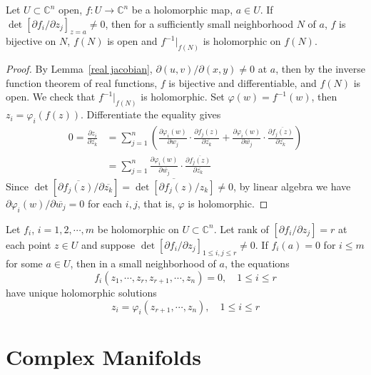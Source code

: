 \begin{thm}
    Let $U\subset\mathbb{C}^n$ open, $f:U\to\mathbb{C}^n$ be a holomorphic map, $a\in U$.
    If $\det[\partial{f_i}/\partial{z_j}]_{z=a}\neq 0$, then for a sufficiently small neighborhood $N$ of $a$, $f$ is bijective on $N$, $f(N)$ is open and $f^{-1}|_{f(N)}$ is holomorphic on $f(N)$.
\end{thm}
\begin{proof}
    By Lemma~\ref{real jacobian}, $\partial(u,v)/\partial(x,y)\neq 0$ at $a$, then by the inverse function theorem of real functions, $f$ is bijective and differentiable, and $f(N)$ is open.
    We check that $f^{-1}|_{f(N)}$ is holomorphic.
    Set $\varphi(w)=f^{-1}(w)$, then $z_i=\varphi_i(f(z))$.
    Differentiate the equality gives
    \begin{align*}
        0=\frac{\partial z_i}{\partial\overline{z_k}}&=\sum_{j=1}^n\left(\frac{\partial\varphi_i(w)}{\partial w_j}\cdot\frac{\partial f_j(z)}{\partial\overline{z_k}}+\frac{\partial\varphi_i(w)}{\partial\overline{w_j}}\cdot\frac{\partial\overline{f_j(z)}}{\partial\overline{z_k}}\right)\\
        &=\sum_{j=1}^n\frac{\partial\varphi_i(w)}{\partial\overline{w_j}}\cdot\frac{\partial\overline{f_j(z)}}{\partial\overline{z_k}}
    \end{align*}
    Since $\det[\partial\overline{f_j(z)}/\partial\overline{z_k}]=\overline{\det[\partial f_j(z)/z_k]}\neq 0$, by linear algebra we have $\partial\varphi_i(w)/\partial\overline{w_j}=0$ for each $i,j$, that is, $\varphi$ is holomorphic.
\end{proof}

\begin{cor}
    Let $f_i$, $i=1,2,\cdots,m$ be holomorphic on $U\subset\mathbb{C}^n$.
    Let rank of $[\partial f_i/\partial z_j]=r$ at each point $z\in U$ and suppose $\det[\partial f_i/\partial z_j]_{1\leq i,j\leq r}\neq 0$.
    If $f_i(a)=0$ for $i\leq m$ for some $a\in U$, then in a small neighborhood of $a$, the equations
    \[f_i(z_1,\cdots,z_r,z_{r+1},\cdots,z_n)=0,\quad 1\leq i\leq r\]
    have unique holomorphic solutions
    \[z_i=\varphi_i(z_{r+1},\cdots,z_n),\quad 1\leq i\leq r\]
\end{cor}

\section{Complex Manifolds}

